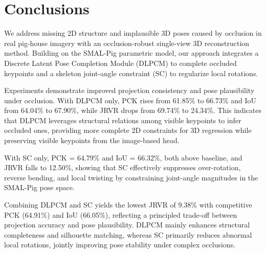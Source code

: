 \documentclass[computers,article,submit,pdftex,moreauthors]{mdpi}
\begin{document}
\section{Conclusions}\label{sec:conclusions}

We address missing 2D structure and implausible 3D poses caused by occlusion in real pig-house imagery with an occlusion-robust single-view 3D reconstruction method. Building on the SMAL-Pig parametric model, our approach integrates a Discrete Latent Pose Completion Module (DLPCM) to complete occluded keypoints and a skeleton joint-angle constraint (SC) to regularize local rotations.

Experiments demonstrate improved projection consistency and pose plausibility under occlusion. With DLPCM only, PCK rises from 61.85\% to 66.73\% and IoU from 64.04\% to 67.90\%, while JRVR drops from 69.74\% to 24.34\%. This indicates that DLPCM leverages structural relations among visible keypoints to infer occluded ones, providing more complete 2D constraints for 3D regression while preserving visible keypoints from the image-based head.

With SC only, PCK = 64.79\% and IoU = 66.32\%, both above baseline, and JRVR falls to 12.50\%, showing that SC effectively suppresses over-rotation, reverse bending, and local twisting by constraining joint-angle magnitudes in the SMAL-Pig pose space.

Combining DLPCM and SC yields the lowest JRVR of 9.38\% with competitive PCK (64.91\%) and IoU (66.05\%), reflecting a principled trade-off between projection accuracy and pose plausibility. DLPCM mainly enhances structural completeness and silhouette matching, whereas SC primarily reduces abnormal local rotations, jointly improving pose stability under complex occlusions.




\end{document}
